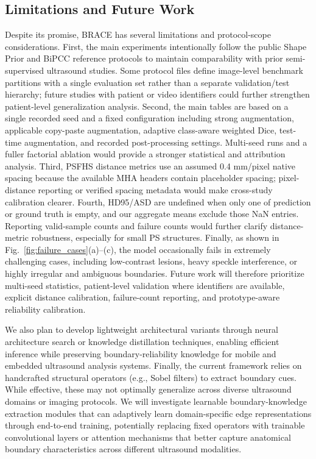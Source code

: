 \documentclass[a4paper,fleqn]{cas-dc}
\begin{document}
\subsection{Limitations and Future Work}

Despite its promise, BRACE has several limitations and protocol-scope considerations. First, the main experiments intentionally follow the public Shape Prior and BiPCC reference protocols to maintain comparability with prior semi-supervised ultrasound studies. Some protocol files define image-level benchmark partitions with a single evaluation set rather than a separate validation/test hierarchy; future studies with patient or video identifiers could further strengthen patient-level generalization analysis. Second, the main tables are based on a single recorded seed and a fixed configuration including strong augmentation, applicable copy-paste augmentation, adaptive class-aware weighted Dice, test-time augmentation, and recorded post-processing settings. Multi-seed runs and a fuller factorial ablation would provide a stronger statistical and attribution analysis. Third, PSFHS distance metrics use an assumed 0.4 mm/pixel native spacing because the available MHA headers contain placeholder spacing; pixel-distance reporting or verified spacing metadata would make cross-study calibration clearer. Fourth, HD95/ASD are undefined when only one of prediction or ground truth is empty, and our aggregate means exclude those NaN entries. Reporting valid-sample counts and failure counts would further clarify distance-metric robustness, especially for small PS structures. Finally, as shown in Fig.~\ref{fig:failure_cases}(a)--(c), the model occasionally fails in extremely challenging cases, including low-contrast lesions, heavy speckle interference, or highly irregular and ambiguous boundaries. Future work will therefore prioritize multi-seed statistics, patient-level validation where identifiers are available, explicit distance calibration, failure-count reporting, and prototype-aware reliability calibration.

We also plan to develop lightweight architectural variants through neural architecture search or knowledge distillation techniques, enabling efficient inference while preserving boundary-reliability knowledge for mobile and embedded ultrasound analysis systems. Finally, the current framework relies on handcrafted structural operators (e.g., Sobel filters) to extract boundary cues. While effective, these may not optimally generalize across diverse ultrasound domains or imaging protocols. We will investigate learnable boundary-knowledge extraction modules that can adaptively learn domain-specific edge representations through end-to-end training, potentially replacing fixed operators with trainable convolutional layers or attention mechanisms that better capture anatomical boundary characteristics across different ultrasound modalities.
\end{document}
